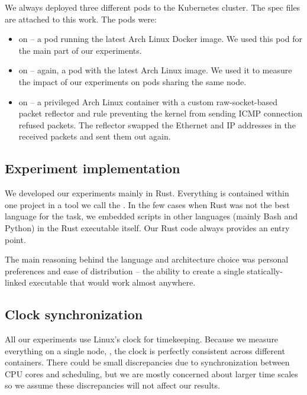 We always deployed three different pods to the Kubernetes cluster. The spec files are attached to this work. The pods were:

\begin{itemize}
    \item {} on  -- a pod running the latest Arch Linux Docker image. We used this pod for the main part of our experiments.

    \item {} on  -- again, a pod with the latest Arch Linux image. We used it to measure the impact of our experiments on pods sharing the same node.

    \item {} on  -- a privileged Arch Linux container with a custom raw-socket-based packet reflector and  rule preventing the kernel from sending ICMP connection refused packets. The reflector swapped the Ethernet and IP addresses in the received packets and sent them out again.
\end{itemize}

\subsection{Experiment implementation}

We developed our experiments mainly in Rust. Everything is contained within one project in a tool we call the . In the few cases when Rust was not the best language for the task, we embedded scripts in other languages (mainly Bash and Python) in the Rust executable itself. Our Rust code always provides an entry point.

The main reasoning behind the language and architecture choice was personal preferences and ease of distribution -- the ability to create a single statically-linked executable that would work almost anywhere.

\subsection{Clock synchronization}

All our experiments use Linux's  clock for timekeeping. Because we measure everything on a single node, , the clock is perfectly consistent across different containers. There could be small discrepancies due to synchronization between CPU cores and scheduling, but we are mostly concerned about larger time scales so we assume these discrepancies will not affect our results.

